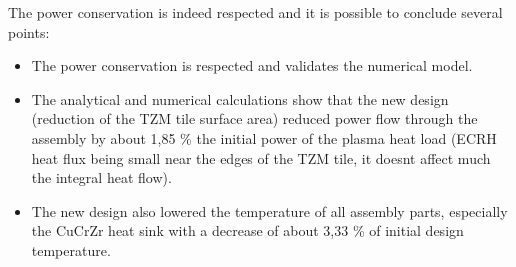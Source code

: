 \normalsize{\indent The power conservation is indeed respected and it is possible to conclude several points:
    \begin{itemize}
        \item The power conservation is respected and validates the numerical model.
        \item The analytical and numerical calculations show that the new design (reduction of the \acrshort{TZM} tile surface area) reduced power flow through the assembly by about 1,85 \% the initial power of the plasma heat load (\acrshort{ECRH} heat flux being small near the edges of the \acrshort{TZM} tile, it doesnt affect much the integral heat flow).
        \item The new design also lowered the temperature of all assembly parts, especially the \acrshort{CuCrZr} heat sink with a decrease of about 3,33 \% of initial design temperature.
    \end{itemize}
}


